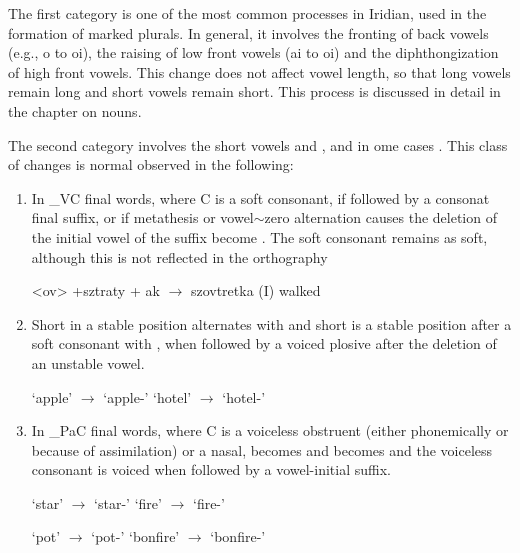 The first category is one of the most common processes in Iridian, used in the formation of marked plurals. In general, it involves the fronting of back vowels (e.g., o to oi), the raising of low front vowels (ai to oi) and the diphthongization of high front vowels. This change does not affect vowel length, so that long vowels remain long and short vowels remain short. This process is discussed in detail in the chapter on nouns.

The second category involves the short vowels  and , and in ome cases . This class of changes is normal observed in the following:

\begin{enumerate}
	\item In \_VC final words, where C is a soft consonant, if followed by a consonat final suffix, or if metathesis or vowel$\sim$zero alternation causes the deletion of the initial vowel of the suffix  become . The soft consonant remains as soft, although this is not reflected in the orthography
	
		\pex
	\a <ov> +sztraty + ak $\rightarrow$ szovtretka (I) walked
	\xe
	\item Short  in a stable position alternates with  and short  is a stable position after a soft consonant with , when followed by a voiced plosive after the deletion of an unstable vowel.
	
	\pex
	\a {} `apple' $\rightarrow$  `apple-'
	\a {} `hotel' $\rightarrow$  `hotel-'
	\xe

	\item In \_PaC final words, where C is a voiceless obstruent (either phonemically or because of assimilation) or a nasal,  becomes  and  becomes  and the voiceless consonant is voiced when followed by a vowel-initial suffix.
	
		\pex
	\a {} `star' $\rightarrow$  `star-'
	\a {} `fire' $\rightarrow$  `fire-'
	\xe

	\pex
	\a {} `pot' $\rightarrow$  `pot-'
	\a {} `bonfire' $\rightarrow$  `bonfire-'
	\xe

\end{enumerate}



